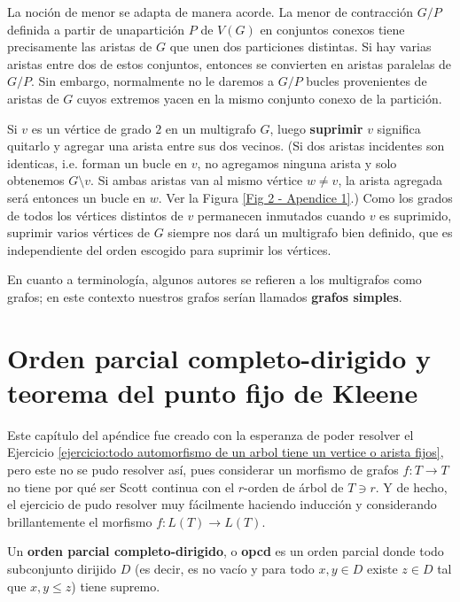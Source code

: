 \documentclass[../main.tex]{subfiles}
\begin{document}
  La noción de menor se adapta de manera acorde. La menor de contracción $G/P$ definida a partir de unapartición $P$
  de $V(G)$ en conjuntos conexos tiene precisamente las aristas de $G$ que unen dos particiones distintas. Si hay
  varias aristas entre dos de estos conjuntos, entonces se convierten en aristas paralelas de $G/P$. Sin embargo,
  normalmente no le daremos a $G/P$ bucles provenientes de aristas de $G$ cuyos extremos yacen en la mismo conjunto
  conexo de la partición.

  Si $v$ es un vértice de grado $2$ en un multigrafo $G$, luego \textbf{suprimir} $v$ significa quitarlo y agregar
  una arista entre sus dos vecinos. (Si dos aristas incidentes son identicas, i.e. forman un bucle en $v$, no
  agregamos ninguna arista y solo obtenemos $G \setminus v$. Si ambas aristas van al mismo vértice $w \neq v$, la
  arista agregada será entonces un bucle en $w$. Ver la Figura \ref{Fig 2 - Apendice 1}.) Como los grados de todos los vértices
  distintos de $v$ permanecen inmutados cuando $v$ es suprimido, suprimir varios vértices de $G$ siempre nos dará un
  multigrafo bien definido, que es independiente del orden escogido para suprimir los vértices.

  En cuanto a terminología, algunos autores se refieren a los multigrafos como grafos; en este contexto nuestros
  grafos serían llamados \textbf{grafos simples}.







\chapter{Orden parcial completo-dirigido y teorema del punto fijo de Kleene}\label{apendice:orden parcial completo
-dirigido y teorema del punto fijo de Kleene}

Este capítulo del apéndice fue creado con la esperanza de poder resolver el Ejercicio \ref{ejercicio:todo
automorfismo de un arbol tiene un vertice o arista fijos}, pero este no se pudo resolver así, pues considerar
 un morfismo de grafos $f : T \rightarrow T$ no tiene por qué ser Scott continua con el $r$-orden de árbol de $
 T \ni r$. Y de hecho, el ejercicio de pudo resolver muy fácilmente haciendo inducción y considerando
 brillantemente el morfismo $f : L(T) \rightarrow L(T)$.

\begin{definition}
    Un \textbf{orden parcial completo-dirigido}, o \textbf{opcd} es un orden parcial donde todo subconjunto
    dirijido $D$ (es
    decir, es no vacío y para todo $x,y \in D$ existe $z \in D$ tal que $x,y \leq z$) tiene supremo.
\end{definition}
\end{document}
